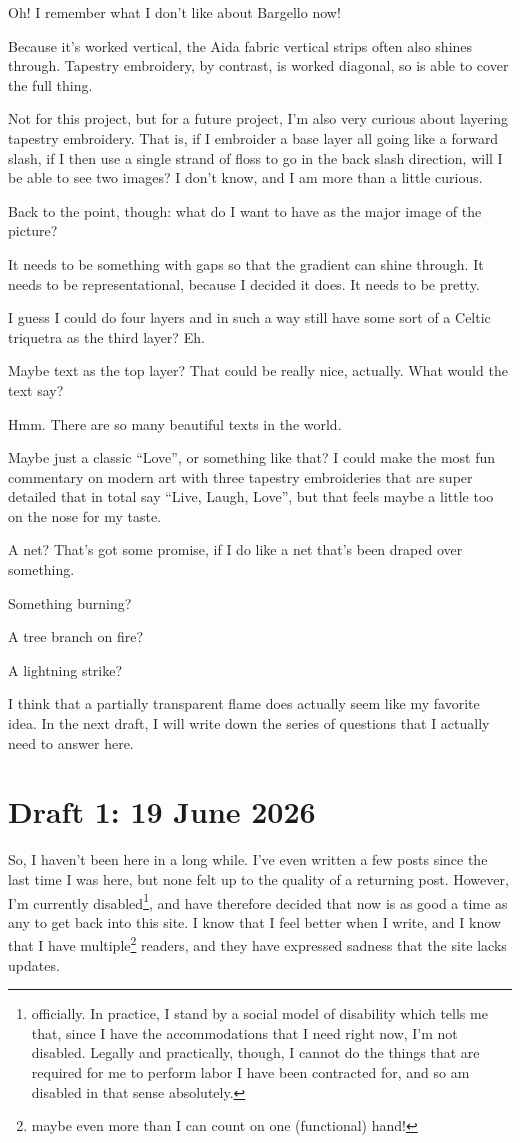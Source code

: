 \documentclass[12pt]{article}
\newcommand{\say}[1]{``#1''}
\renewcommand{\,}{\textsuperscript{,}}
\begin{document}
Oh! I remember what I don't like about Bargello now!

Because it's worked vertical, the Aida fabric vertical strips often also shines through.  
Tapestry embroidery, by contrast, is worked diagonal, so is able to cover the full thing.

Not for this project, but for a future project, I'm also very curious about layering tapestry embroidery.  
That is, if I embroider a base layer all going like a forward slash, if I then use a single strand of floss to go in the back slash direction, will I be able to see two images?  
I don't know, and I am more than a little curious.

Back to the point, though: what do I want to have as the major image of the picture?

It needs to be something with gaps so that the gradient can shine through.  
It needs to be representational, because I decided it does.  
It needs to be pretty.  
  
I guess I could do four layers and in such a way still have some sort of a Celtic triquetra as the third layer?  
Eh.

Maybe text as the top layer?  
That could be really nice, actually.  
What would the text say?

Hmm.  
There are so many beautiful texts in the world.

Maybe just a classic \say{Love}, or something like that?  
I could make the most fun commentary on modern art with three tapestry embroideries that are super detailed that in total say \say{Live, Laugh, Love}, but that feels maybe a little too on the nose for my taste.

A net?  
That's got some promise, if I do like a net that's been draped over something.

Something burning?

A tree branch on fire?

A lightning strike?

I think that a partially transparent flame does actually seem like my favorite idea.  
In the next draft, I will write down the series of questions that I actually need to answer here.

\section{Draft 1: 19 June 2026}

So, I haven't been here in a long while.  
I've even written a few posts since the last time I was here, but none felt up to the quality of a returning post.  
However, I'm currently disabled\footnote{officially. In practice, I stand by a social model of disability which tells me that, since I have the accommodations that I need right now, I'm not disabled. Legally and practically, though, I cannot do the things that are required for me to perform labor I have been contracted for, and so am disabled in that sense absolutely.}, and have therefore decided that now is as good a time as any to get back into this site.  
I know that I feel better when I write, and I know that I have multiple\footnote{maybe even more than I can count on one (functional) hand!} readers, and they have expressed sadness that the site lacks updates.
\end{document}
